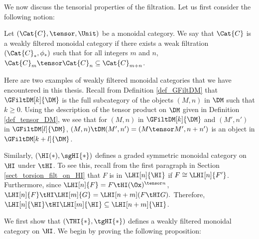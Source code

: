 We now discuss the tensorial properties of the filtration. Let us
first consider the following notion:

\begin{defn}\label{def_graded_tensor}
Let $(\Cat{C}, \tensor, \Unit)$ be a monoidal category. We say 
that $\Cat{C}$ is a weakly filtered monoidal category if there 
exists a weak filtration $(\Cat{C}_*, \phi_*)$ such that for all
integers $m$ and $n$, $\Cat{C}_m \tensor \Cat{C}_n \subseteq
\Cat{C}_{m + n}$.
\end{defn}

\begin{ex}
Here are two examples of weakly filtered monoidal categories
that we have encountered in this thesis. Recall from Definition 
\ref{def_GFiltDM} that $\GFiltDM[k]{\DM}$ is the full subcategory
of the objects $(M, n)$ in $\DM$ such that $k \geq 0$. Using the
description of the tensor product on $\DM$ given in Definition
\ref{def_tensor_DM}, we see that for $(M, n)$ in $\GFiltDM[k]{\DM}$
and $(M', n')$ in $\GFiltDM[l]{\DM}$, $(M, n) \tDM (M', n') =
(M \tensor M', n + n')$ is an object in $\GFiltDM[k + l]{\DM}$.

Similarly, $(\HI(*), \sgHI{*})$ defines a graded symmetric 
monoidal category on $\HI$ under $\tHI$. To see this, recall
from the first paragraph in Section \ref{sect_torsion_filt_on_HI}
that $F$ is in $\LHI[n]{\HI}$ if $F \cong \LHI[n]{F'}$. 
Furthermore, since $\LHI[n]{F} = F \tHI (\Ox)^{\tensor n}$, 
$\LHI[n]{F} \tHI \LHI[m]{G} = \LHI[n + m](F \tHI G).$ Therefore, 
$\LHI[n]{\HI} \tHI \LHI[m]{\HI} \subseteq \LHI[n + m]{\HI}$.
\end{ex}

We first show that $(\THI{*}, \tgHI{*})$ defines a weakly filtered 
monoidal category on $\HI$. We begin by proving the following
proposition:


